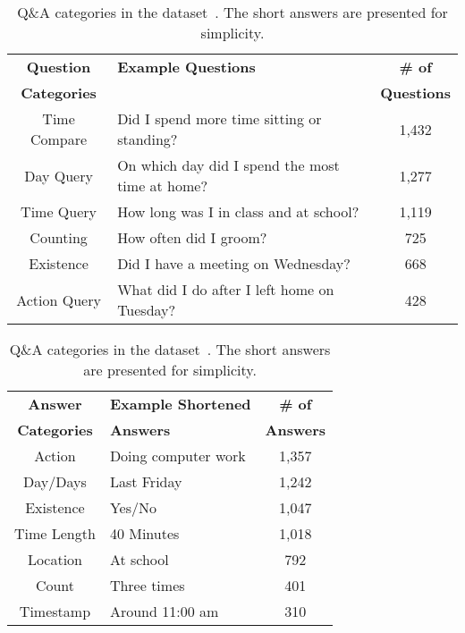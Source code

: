 \begin{table}[pt]
\begin{subtable}[t]{0.6\textwidth}
\footnotesize
\centering
\begin{tabular}{c p{5.0cm} c} %
\toprule
\textbf{Question} & \textbf{Example Questions} & \textbf{\# of} \\
\textbf{Categories} & & \textbf{Questions} \\
\midrule
Time Compare & Did I spend more time sitting or standing? & 1,432 \\
Day Query & On which day did I spend the most time at home? & 1,277 \\
Time Query & How long was I in class and at school? & 1,119 \\
Counting & How often did I groom? & 725 \\
Existence & Did I have a meeting on Wednesday? & 668 \\
Action Query & What did I do after I left home on Tuesday? & 428 \\
\bottomrule
\end{tabular}
\caption{Question categories.}
\label{tab:question_profile}
\end{subtable}
\begin{subtable}[t]{0.35\textwidth}
\centering
\footnotesize
\begin{tabular}{c p{2.6cm} c} %
\toprule
\textbf{Answer} & \textbf{Example Shortened} & \textbf{\# of} \\
\textbf{Categories} & \textbf{Answers} & \textbf{Answers} \\
\midrule
Action & Doing computer work & 1,357 \\
Day/Days & Last Friday & 1,242 \\
Existence & Yes/No & 1,047 \\
Time Length & 40 Minutes & 1,018 \\
Location & At school & 792 \\
Count & Three times & 401\\
Timestamp & Around 11:00 am & 310 \\
\bottomrule
\end{tabular}
\caption{Answer categories.}
\vspace{-5mm}
\label{tab:answer_profile}
\end{subtable}
\caption{Q\&A categories in the \Dataset dataset~\cite{sensorqa}. The short answers are presented for simplicity.}
\label{tab:sensorqa_profile}
\vspace{-7mm}
\end{table}


